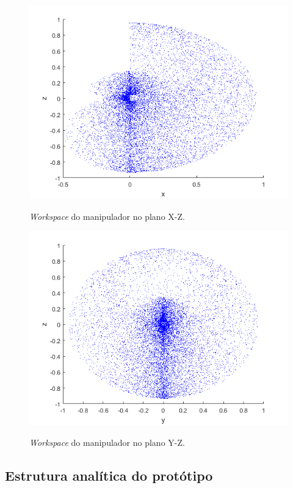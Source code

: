 \begin{figure}[H]
    \caption{\textit{{Workspace}} do manipulador no plano  X-Z.}
    \centering
    \includegraphics[scale=0.8]{images/workspace_xz.png}
    \label{fig:workspace_xz}
\end{figure}


\begin{figure}[H]
    \caption{\textit{{Workspace}} do manipulador no plano  Y-Z.}
    \centering
    \includegraphics[scale=0.8]{images/workspace_yz.png}
    \label{fig:workspace_yz}
\end{figure}

\subsection{Estrutura analítica do protótipo}
\label{sub:eap}

